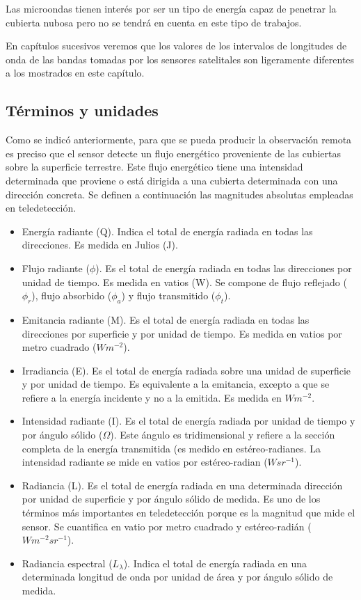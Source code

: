 Las microondas tienen interés por ser un tipo de energía capaz de penetrar la cubierta nubosa pero no se tendrá en cuenta en este tipo de trabajos.\Sep

En capítulos sucesivos veremos que los valores de los intervalos de longitudes de onda de las bandas tomadas por los sensores satelitales son ligeramente diferentes a los mostrados en este capítulo.

\subsection{Términos y unidades}
Como se indicó anteriormente, para que se pueda producir la observación remota es preciso que el sensor detecte un flujo energético proveniente de las cubiertas sobre la superficie terrestre. Este flujo energético tiene una intensidad determinada que proviene o está dirigida a una cubierta determinada con una dirección concreta. Se definen a continuación las magnitudes absolutas empleadas en teledetección.

\begin{itemize}
	\item Energía radiante (Q). Indica el total de energía radiada en todas las direcciones. Es medida en Julios (J).
	\item Flujo radiante ($\phi$). Es el total de energía radiada en todas las direcciones por unidad de tiempo. Es medida en vatios (W). Se compone de flujo reflejado ($\phi_{r}$), flujo absorbido ($\phi_{a}$) y flujo transmitido ($\phi_{t}$).
	\item Emitancia radiante (M). Es el total de energía radiada en todas las direcciones por superficie y por unidad de tiempo. Es medida en vatios por metro cuadrado ($Wm^{-2}$).
	\item Irradiancia (E). Es el total de energía radiada sobre una unidad de superficie y por unidad de tiempo. Es equivalente a la emitancia, excepto a que se refiere a la energía incidente y no a la emitida. Es medida en $Wm^{-2}$.
	\item Intensidad radiante (I). Es el total de energía radiada por unidad de tiempo y por ángulo sólido ($\Omega$). Este ángulo es tridimensional y refiere a la sección completa de la energía transmitida (es medido en estéreo-radianes. La intensidad radiante se mide en vatios por estéreo-radian ($Wsr^{-1}$).
	\item Radiancia (L). Es el total de energía radiada en una determinada dirección por unidad de superficie y por ángulo sólido de medida. Es uno de los términos más importantes en teledetección porque es la magnitud que mide el sensor. Se cuantifica en vatio por metro cuadrado y estéreo-radián ($Wm^{-2}sr^{-1}$).
	\item Radiancia espectral ($L_{\lambda}$). Indica el total de energía radiada en una determinada longitud de onda por unidad de área y por ángulo sólido de medida.
\end{itemize}

